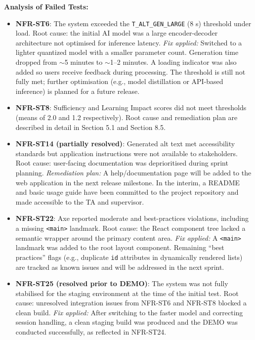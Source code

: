 \documentclass[12pt, titlepage]{article}
\begin{document}
\textbf{Analysis of Failed Tests:}
\begin{itemize}
  \item \textbf{NFR-ST6}: The system exceeded the
    \texttt{T\_ALT\_GEN\_LARGE} (8 s) threshold under load. Root
    cause: the initial AI model was a large encoder-decoder
    architecture not optimised for inference latency. \textit{Fix
    applied:} Switched to a lighter quantized model with a smaller
    parameter count. Generation time dropped from $\sim$5 minutes to
    $\sim$1–2 minutes. A loading indicator was also added so users
    receive feedback during processing. The threshold is still not
    fully met; further optimisation (e.g., model distillation or
    API-based inference) is planned for a future release.

  \item \textbf{NFR-ST8}: Sufficiency and Learning Impact scores did
    not meet thresholds (means of 2.0 and 1.2 respectively). Root
    cause and remediation plan are described in detail in Section 5.1
    and Section 8.5.

  \item \textbf{NFR-ST14 (partially resolved)}: Generated alt text
    met accessibility standards but application instructions were not
    available to stakeholders. Root cause: user-facing documentation
    was deprioritised during sprint planning. \textit{Remediation
    plan:} A help/documentation page will be added to the web
    application in the next release milestone. In the interim, a
    README and basic usage guide have been committed to the project
    repository and made accessible to the TA and supervisor.

  \item \textbf{NFR-ST22}: Axe reported moderate and best-practices
    violations, including a missing \texttt{<main>} landmark. Root
    cause: the React component tree lacked a semantic wrapper around
    the primary content area. \textit{Fix applied:} A \texttt{<main>}
    landmark was added to the root layout component. Remaining ``best
    practices'' flags (e.g., duplicate \texttt{id} attributes in
    dynamically rendered lists) are tracked as known issues and will
    be addressed in the next sprint.

  \item \textbf{NFR-ST25 (resolved prior to DEMO)}: The system was
    not fully stabilised for the staging environment at the time of
    the initial test. Root cause: unresolved integration issues from
    NFR-ST6 and NFR-ST8 blocked a clean build. \textit{Fix applied:}
    After switching to the faster model and correcting session
    handling, a clean staging build was produced and the DEMO was
    conducted successfully, as reflected in NFR-ST24.
\end{itemize}
\end{document}
